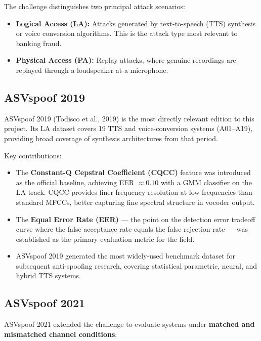 \documentclass[12pt,a4paper]{article}
\begin{document}
The challenge distinguishes two principal attack scenarios:

\begin{itemize}
  \item \textbf{Logical Access (LA):} Attacks generated by text-to-speech (TTS) synthesis
    or voice conversion algorithms. This is the attack type most relevant to banking fraud.
  \item \textbf{Physical Access (PA):} Replay attacks, where genuine recordings are
    replayed through a loudspeaker at a microphone.
\end{itemize}

\subsection{ASVspoof 2019}

ASVspoof 2019 (Todisco et al., 2019) is the most directly relevant edition to this
project. Its LA dataset covers 19 TTS and voice-conversion systems (A01--A19), providing
broad coverage of synthesis architectures from that period.

Key contributions:
\begin{itemize}
  \item The \textbf{Constant-Q Cepstral Coefficient (CQCC)} feature was introduced as the
    official baseline, achieving EER $\approx 0.10$ with a GMM classifier on the LA track.
    CQCC provides finer frequency resolution at low frequencies than standard MFCCs, better
    capturing fine spectral structure in vocoder output.
  \item The \textbf{Equal Error Rate (EER)} --- the point on the detection error tradeoff
    curve where the false acceptance rate equals the false rejection rate --- was established
    as the primary evaluation metric for the field.
  \item ASVspoof 2019 generated the most widely-used benchmark dataset for subsequent
    anti-spoofing research, covering statistical parametric, neural, and hybrid TTS systems.
\end{itemize}

\subsection{ASVspoof 2021}

ASVspoof 2021 extended the challenge to evaluate systems under \textbf{matched and
mismatched channel conditions}:
\end{document}
